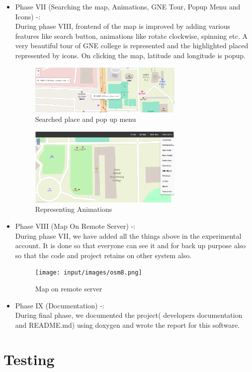 \begin{itemize}
\item Phase VII (Searching the map, Animations, GNE Tour, Popup Menu and Icons) -: \\
        During phase VIII, frontend of the map is improved by adding various features like search button, animations like rotate clockwise, spinning etc. A very beautiful tour of GNE college is represented and the highlighted placed represented by icons. On clicking the map, latitude and longitude is popup.
        \begin{figure}[h!]
                \centering \includegraphics[width=0.7\textwidth]{input/images/osm_search.png}
                \caption{Searched place and pop up menu}
        \end{figure}

        \begin{figure}[h!]
                \centering \includegraphics[width=0.7\textwidth]{input/images/osm_animations.png}
                \caption{Representing Animations}
        \end{figure}


\item Phase VIII (Map On Remote Server) -: \\
During phase VII, we have added all the things above in the experimental account. It is done so that everyone can see it and for back up purpose also so that the code and project retains on other system also.
\begin{figure}[ht]
\centering \texttt{[image: input/images/osm8.png]}
\caption{Map on remote server}
\end{figure}
\item Phase IX (Documentation) -: \\
During final phase, we documented the project( developers documentation and README.md)
using doxygen and wrote the report for this software.
\end{itemize}

\section{Testing}

